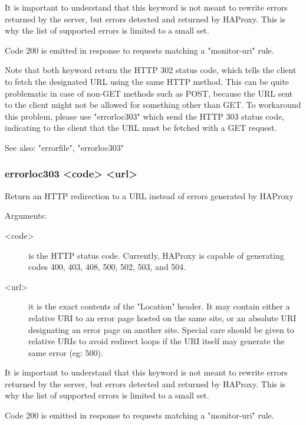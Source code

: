   It is important to understand that this keyword is not meant to rewrite
  errors returned by the server, but errors detected and returned by HAProxy.
  This is why the list of supported errors is limited to a small set.

  Code 200 is emitted in response to requests matching a "monitor-uri" rule.

  Note that both keyword return the HTTP 302 status code, which tells the
  client to fetch the designated URL using the same HTTP method. This can be
  quite problematic in case of non-GET methods such as POST, because the URL
  sent to the client might not be allowed for something other than GET. To
  workaround this problem, please use "errorloc303" which send the HTTP 303
  status code, indicating to the client that the URL must be fetched with a GET
  request.

  See also: "errorfile", "errorloc303"

\subsubsection[errorloc303]{errorloc303 <code> <url>}
  Return an HTTP redirection to a URL instead of errors generated by HAProxy
  
  
  Arguments:
  \begin{description}
  \item[<code>]    is the HTTP status code. Currently, HAProxy is capable of
              generating codes 400, 403, 408, 500, 502, 503, and 504.

  \item[<url>]     it is the exact contents of the "Location" header. It may contain
              either a relative URI to an error page hosted on the same site,
              or an absolute URI designating an error page on another site.
              Special care should be given to relative URIs to avoid redirect
              loops if the URI itself may generate the same error (eg: 500).
  \end{description}

  It is important to understand that this keyword is not meant to rewrite
  errors returned by the server, but errors detected and returned by HAProxy.
  This is why the list of supported errors is limited to a small set.

  Code 200 is emitted in response to requests matching a "monitor-uri" rule.

